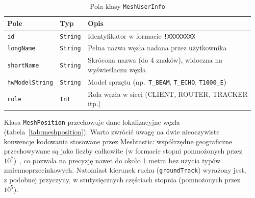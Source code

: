 \begin{table}[!h]
    \caption{Pola klasy \texttt{MeshUserInfo}}
    \label{tab:meshuserinfo}
    \centering
    \begin{tabular}{|l|l|p{6.5cm}|}
        \hline
        \textbf{Pole} & \textbf{Typ} & \textbf{Opis} \\
        \hline
        \texttt{id}            & \texttt{String}  & Identyfikator w formacie \texttt{!XXXXXXXX} \\
        \texttt{longName}      & \texttt{String}  & Pełna nazwa węzła nadana przez użytkownika \\
        \texttt{shortName}     & \texttt{String}  & Skrócona nazwa (do 4 znaków), widoczna na wyświetlaczu węzła \\
        \texttt{hwModelString} & \texttt{String} & Model sprzętu (np.\ \texttt{T\_BEAM}, \texttt{T\_ECHO}, \texttt{T1000\_E}) \\
        \texttt{role}          & \texttt{Int}     & Rola węzła w sieci (CLIENT, ROUTER, TRACKER itp.) \\
        \hline
    \end{tabular}
\end{table}

Klasa \texttt{MeshPosition} przechowuje dane lokalizacyjne węzła
(tabela~\ref{tab:meshposition}). Warto zwrócić uwagę na dwie nieoczywiste konwencje
kodowania stosowane przez Meshtastic: współrzędne geograficzne przechowywane są jako liczby
całkowite (w formacie stopni pomnożonych przez $10^7$)~\cite{meshtasticAndroidNodeSource},
co pozwala na precyzję nawet do około 1 metra bez użycia typów zmiennoprzecinkowych. Natomiast kierunek ruchu (\texttt{groundTrack}) wyrażony jest, z podobnej przyczyny, w stutysięcznych częściach stopnia (pomnożonych przez $10^5$).

